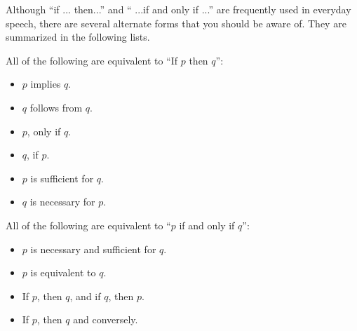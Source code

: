 \documentclass[10pt,]{book}
\theoremstyle{plain}
\theoremstyle{definition}
\theoremstyle{definition}
\theoremstyle{definition}
\theoremstyle{definition}
\begin{document}
Although ``if ... then...'' and `` ...if and only if ...'' are frequently used in everyday speech,
 there are several alternate forms that you should be aware of. They are summarized in the following lists.%
\par
All of the following are equivalent to ``If \(p\) then \(q\)'':%
\par
\leavevmode%
\begin{itemize}[label=\textbullet]
\item{}\(p\) implies \(q\).%
\item{}\(q\) follows from \(q\).%
\item{}\(p\), only if \(q\).%
\item{}\(q\), if \(p\).%
\item{}\(p\) is sufficient for \(q\).%
\item{}\(q\) is necessary for \(p\).%
\end{itemize}

%
\par
All of the following are equivalent to ``\(p\) if and only if \(q\)'':%
\par

\leavevmode%
\begin{itemize}[label=\textbullet]
\item{}\(p\) is necessary and sufficient for \(q\).%
\item{}\(p\) is equivalent to \(q\).%
\item{}If \(p\), then \(q\), and if \(q\), then \(p\).%
\item{}If \(p\), then \(q\) and conversely.%
\end{itemize}

%
\typeout{************************************************}
\typeout{************************************************}
\end{document}

